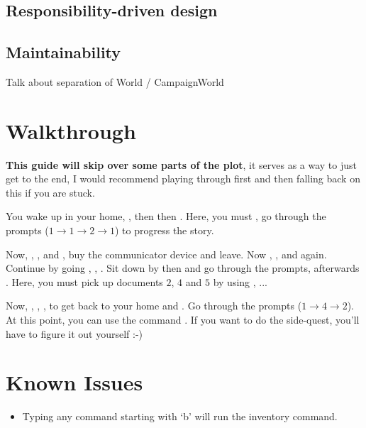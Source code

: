 \documentclass{article}
\begin{document}
\begin{multicols}{2}
            \subsection{Responsibility-driven design}

            \subsection{Maintainability}
                Talk about separation of World / CampaignWorld

        \section{Walkthrough}
            \textbf{\color{cRed}This guide will skip over some parts of the plot}, it serves as a way to just get to the end, I would recommend playing through first and then falling back on this if you are stuck.

            You wake up in your home, , then  then . Here, you must , go through the prompts ($1 \rightarrow 1 \rightarrow 2 \rightarrow 1$) to progress the story. 

            Now, , ,  and , buy the communicator device and leave. Now , ,  and  again. Continue by going , , . Sit down by  then  and go through the prompts, afterwards . Here, you must pick up documents $2$, $4$ and $5$ by using , ...

            Now, , , ,  to get back to your home and . Go through the prompts ($1 \rightarrow 4 \rightarrow 2$). At this point, you can use the command . If you want to do the side-quest, you'll have to figure it out yourself :-)

        \section{Known Issues}
        
            \begin{itemize}[leftmargin=*]
                \item Typing any command starting with `b' will run the inventory command.
            \end{itemize}

    \end{multicols}
\end{document}
